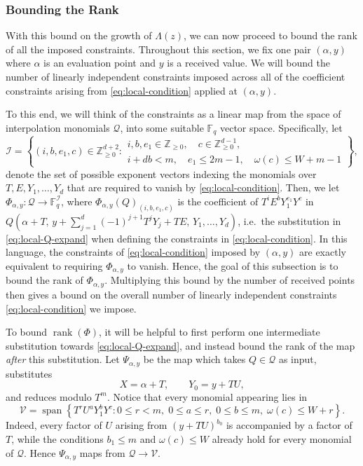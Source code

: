 \documentclass[11pt]{article}
\newcommand{\rank}{\operatorname{rank}}
\newcommand{\F}{\mathbb F}
\newcommand{\kai}[1]{{\color{red} {{[Kai: #1]}}}}
\newcommand{\josh}[1]{{\color{green!50!black} {{[Josh: #1]}}}}
\begin{document}
\subsubsection{Bounding the Rank}
With this bound on the growth of $\Lambda(z)$, we can now proceed to bound the rank of all the imposed constraints. Throughout this section, we fix one pair $(\alpha, y)$ where $\alpha$ is an evaluation point and $y$ is a received value. We will bound the number of linearly independent constraints imposed across all of the coefficient constraints arising from \eqref{eq:local-condition} applied at $(\alpha, y)$. 

To this end, we will think of the constraints as a linear map from the space of interpolation monomials
$\mathcal{Q}$, into some suitable $\F_q$ vector space. Specifically, let 
\[
\mathcal I
=
\left\{
(i, b, e_1,c) \in \mathbb{Z}_{\geq 0}^{d+2}:
\begin{array}{l}
i,b,e_1\in\mathbb Z_{\ge0},\quad
c\in\mathbb Z_{\ge0}^{d-1},\\
i+db<m,\quad
e_1\le2m-1,\quad
\omega(c)\le W+m-1
\end{array}
\right\},
\]
denote the set of possible exponent vectors indexing the monomials over $T, E, Y_1,\ldots, Y_d$ that are required to vanish 
by \eqref{eq:local-condition}. Then, we let $\Phi_{\alpha,y}: \mathcal{Q} \to \F_q^{\mathcal{I}}$, where $\Phi_{\alpha,y}(Q)_{(i,b,e_1,c)}$ is the coefficient of $T^iE^bY_1^{e_1}Y^c$ in $Q\left(
\alpha+T,\,
y+\sum_{j=1}^d(-1)^{j+1}T^jY_j+TE,\,
Y_1,\ldots,Y_d
\right)$, i.e.\ the substitution in \eqref{eq:local-Q-expand} when defining the constraints in \eqref{eq:local-condition}. In this language, the constraints of \eqref{eq:local-condition} imposed by $(\alpha, y)$ are exactly equivalent to requiring $\Phi_{\alpha, y}$ to vanish. Hence, the goal of this subsection is  to bound the rank of $\Phi_{\alpha,y}$. Multiplying this bound by the number of received points then gives a bound on the overall number of linearly independent constraints \eqref{eq:local-condition} we impose.

To bound $\rank(\Phi)$, it will be helpful to first perform one intermediate substitution towards \eqref{eq:local-Q-expand}, and instead bound the rank of the map \emph{after} this substitution. Let $\Psi_{\alpha,y}$ be the map which takes $Q \in \mathcal{Q}$ as input, substitutes
\[
X=\alpha+T,
\qquad
Y_0=y+TU,
\]
and reduces modulo $T^m$. Notice that every
monomial appearing lies in
\[
\mathcal V
=
\operatorname{span}
\left\{
T^rU^aY_1^bY^c:
0\le r<m,\;
0\le a\le r,\;
0\le b\le m,\;
\omega(c)\le W+r
\right\}.
\]
Indeed, every factor of $U$ arising from $(y+TU)^{b_0}$ is accompanied
by a factor of $T$, while the conditions $b_1\le m$ and $\omega(c)\le W$ already hold
for every monomial of $\mathcal Q$. Hence $\Psi_{\alpha,y}$ maps from $\mathcal{Q} \to \mathcal{V}$. 
\end{document}

